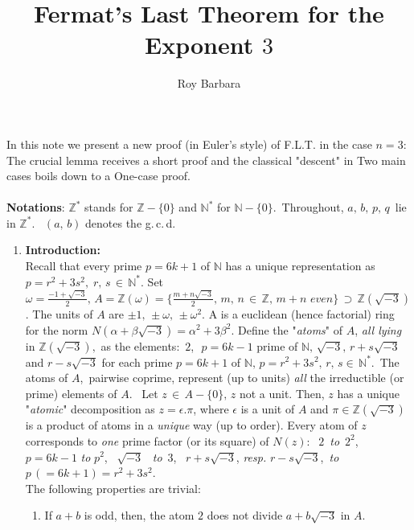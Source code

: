 \documentclass[11pt,a4paper]{article}
\title{Fermat's Last Theorem for the Exponent $3$}
\author{Roy Barbara }
\date{}
\begin{document}
%
\maketitle
%
%
$ $\\
In this note we present a new proof (in Euler's style) of F.L.T. in the case $n=3$: The crucial lemma receives a short proof and the classical  "descent" in Two main cases boils down to a One-case proof.\\ \\
\textbf{\hspace*{.3cm}Notations}: $\mathbb{Z}^*$ stands for $\mathbb{Z}-\{0\}$ and $\mathbb{N}^*$ for $\mathbb{N}-\{0\}$.\, Throughout, $a,\,b,\,p,\,q\,$ lie in $\mathbb{Z}^*$. \, \hspace*{.8cm} $(a,\,b)$ denotes the g.\,c.\,d.
\begin{enumerate}
\item \textbf{Introduction:}\\
  Recall that every prime $p=6k+1$ of $\mathbb{N}$ has a unique representation as $p=r^2+3s^2,\;r,\,s\,\in\,\mathbb{N}^*$. Set $\displaystyle \omega = \frac{-1+\sqrt{-3}}{2},\,A=\mathbb{Z}(\omega)=\{\displaystyle \frac{m+n\sqrt{-3}}{2},\,m,\,n\,\in\,\mathbb{Z},\,m+n\,\,even\}\,\supset\,\mathbb{Z}(\sqrt{-3})$. The units of $A$ are $\pm1,\,\pm\omega,\,\pm\omega^2$. A is a euclidean (hence factorial) ring for the norm $N(\alpha+\beta \sqrt{-3})=\alpha^2+3\beta^2$. Define the "\textit{atoms}" of $A$, \textit{all lying} in $\mathbb{Z}(\sqrt{-3}),$ as the elements: \,$2$,\, \,$p=6k-1$ prime of $\mathbb{N},\,\sqrt{-3},\,r+s\sqrt{-3}$ and $r-s\sqrt{-3}$ for each prime $p=6k+1$ of $\mathbb{N},\,p=r^2+3s^2,\,r,\,s\in\,\mathbb{N}^*$.\,
  The atoms of $A$,\, pairwise coprime, represent (up to units) \textit{all} the irreductible (or prime) elements of $A$. \,
  Let $z\,\in\,A-\{0\},\,z$ not a unit. Then, $z$ has a unique "\textit{atomic}" decomposition as $z=\epsilon . \pi$, where $\epsilon$ is a unit of $A$ and $\pi\in \mathbb{Z}(\sqrt{-3})$ is a product of atoms in a \textit{unique} way (up to order). Every  atom of $z$ corresponds to \textit{one} prime factor (or its square) of $N(z):\; $ $2$ \,\textit{to} \,$2^2$, \,$p=6k-1$  \textit{to}  $p^2$, \, $\sqrt{-3}$ \, \textit{to} \,$3$, \, $r+s\sqrt{-3}$, \textit{resp.} $r-s\sqrt{-3}$, \,\textit{to} \, $p\, (=6k+1)=r^2+3s^2$.\\
  The following properties are trivial:
  \begin{enumerate}[(R1)]
     \item If $a+b$ is odd, then, the atom $2$ does not divide $a+b\sqrt{-3}$ in $A$.

\end{enumerate}
\end{enumerate}
\end{document}
